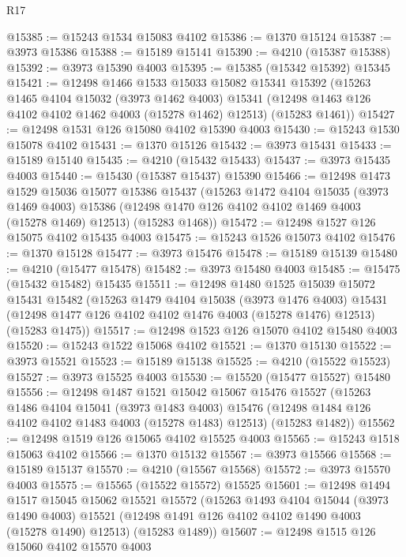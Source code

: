 \begin{lexlean}{R17}
\begin{coremodule}
@15385 := @15243 @1534 @15083 @4102
@15386 := @1370 @15124
@15387 := @3973 @15386
@15388 := @15189 @15141
@15390 := @4210 (@15387 @15388)
@15392 := @3973 @15390 @4003
@15395 := @15385 (@15342 @15392) @15345
@15421 := @12498
    @1466
    @1533
    @15033
    @15082
    @15341
    @15392
    (@15263
      @1465
      @4104
      @15032
      (@3973 @1462 @4003)
      @15341
      (@12498 @1463 @126 @4102 @4102 @1462 @4003 (@15278 @1462) @12513)
      (@15283 @1461))
@15427 := @12498 @1531 @126 @15080 @4102 @15390 @4003
@15430 := @15243 @1530 @15078 @4102
@15431 := @1370 @15126
@15432 := @3973 @15431
@15433 := @15189 @15140
@15435 := @4210 (@15432 @15433)
@15437 := @3973 @15435 @4003
@15440 := @15430 (@15387 @15437) @15390
@15466 := @12498
    @1473
    @1529
    @15036
    @15077
    @15386
    @15437
    (@15263
      @1472
      @4104
      @15035
      (@3973 @1469 @4003)
      @15386
      (@12498 @1470 @126 @4102 @4102 @1469 @4003 (@15278 @1469) @12513)
      (@15283 @1468))
@15472 := @12498 @1527 @126 @15075 @4102 @15435 @4003
@15475 := @15243 @1526 @15073 @4102
@15476 := @1370 @15128
@15477 := @3973 @15476
@15478 := @15189 @15139
@15480 := @4210 (@15477 @15478)
@15482 := @3973 @15480 @4003
@15485 := @15475 (@15432 @15482) @15435
@15511 := @12498
    @1480
    @1525
    @15039
    @15072
    @15431
    @15482
    (@15263
      @1479
      @4104
      @15038
      (@3973 @1476 @4003)
      @15431
      (@12498 @1477 @126 @4102 @4102 @1476 @4003 (@15278 @1476) @12513)
      (@15283 @1475))
@15517 := @12498 @1523 @126 @15070 @4102 @15480 @4003
@15520 := @15243 @1522 @15068 @4102
@15521 := @1370 @15130
@15522 := @3973 @15521
@15523 := @15189 @15138
@15525 := @4210 (@15522 @15523)
@15527 := @3973 @15525 @4003
@15530 := @15520 (@15477 @15527) @15480
@15556 := @12498
    @1487
    @1521
    @15042
    @15067
    @15476
    @15527
    (@15263
      @1486
      @4104
      @15041
      (@3973 @1483 @4003)
      @15476
      (@12498 @1484 @126 @4102 @4102 @1483 @4003 (@15278 @1483) @12513)
      (@15283 @1482))
@15562 := @12498 @1519 @126 @15065 @4102 @15525 @4003
@15565 := @15243 @1518 @15063 @4102
@15566 := @1370 @15132
@15567 := @3973 @15566
@15568 := @15189 @15137
@15570 := @4210 (@15567 @15568)
@15572 := @3973 @15570 @4003
@15575 := @15565 (@15522 @15572) @15525
@15601 := @12498
    @1494
    @1517
    @15045
    @15062
    @15521
    @15572
    (@15263
      @1493
      @4104
      @15044
      (@3973 @1490 @4003)
      @15521
      (@12498 @1491 @126 @4102 @4102 @1490 @4003 (@15278 @1490) @12513)
      (@15283 @1489))
@15607 := @12498 @1515 @126 @15060 @4102 @15570 @4003

\end{coremodule}
\end{lexlean}
